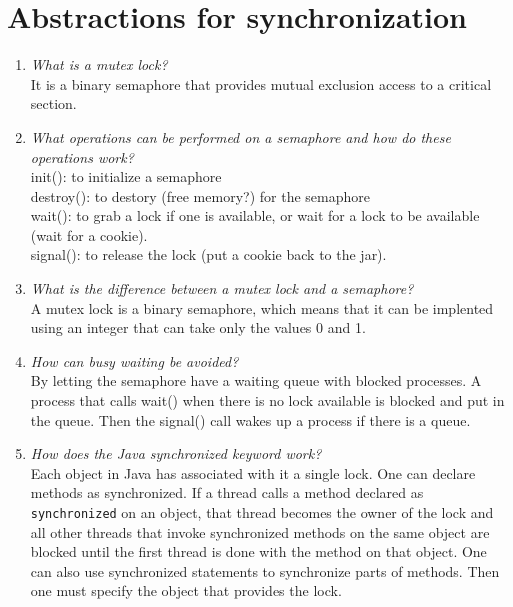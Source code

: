 \documentclass[a4paper]{article}
\begin{document}
\section{Abstractions for synchronization}
\begin{enumerate}

  \item \textit{ What is a mutex lock? }\\

    It is a binary semaphore that provides mutual exclusion access to a critical section. 

  \item \textit{ What operations can be performed on a semaphore and how do these operations work? }\\

    init(): to initialize a semaphore \\
    destroy(): to destory (free memory?) for the semaphore \\
    wait(): to grab a lock if one is available, or wait for a lock to be available (wait for a cookie). \\
    signal(): to release the lock (put a cookie back to the jar). 

  \item \textit{ What is the difference between a mutex lock and a semaphore? }\\

    A mutex lock is a binary semaphore, which means that it can be implented using an integer that can take only the values 0 and 1. 

  \item \textit{ How can busy waiting be avoided? }\\

    By letting the semaphore have a waiting queue with blocked processes. A process that calls wait() when there is no lock available is blocked and put in the queue. Then the signal() call wakes up a process if there is a queue.

  \item \textit{ How does the Java synchronized keyword work? }\\

    Each object in Java has associated with it a single lock. One can declare methods as synchronized. If a thread calls a method declared as \texttt{synchronized} on an object, that thread becomes the owner of the lock and all other threads that invoke synchronized methods on the same object are blocked until the first thread is done with the method on that object. One can also use synchronized statements to synchronize parts of methods. Then one must specify the object that provides the lock. 


\end{enumerate}
\end{document}
